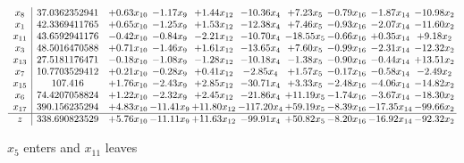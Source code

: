 \documentclass[9pt]{article}
\begin{document}
 \[\begin{array}{c| c c@{\hskip 2pt} c@{\hskip 2pt} c@{\hskip 2pt} c@{\hskip 2pt} c@{\hskip 2pt} c@{\hskip 2pt} c@{\hskip 2pt} c@{\hskip 2pt} }
 x_{8}   &  37.0362352941 & +  0.63 x_{10} & -1.17 x_{9} & +  1.44 x_{12} & -10.36 x_{4} & +  7.23 x_{5} & -0.79 x_{16} & -1.87 x_{14} & -10.98 x_{2}\\
 x_{1}   &  42.3369411765 & +  0.65 x_{10} & -1.25 x_{9} & +  1.53 x_{12} & -12.38 x_{4} & +  7.46 x_{5} & -0.93 x_{16} & -2.07 x_{14} & -11.60 x_{2}\\
 x_{11}   &  43.6592941176 & -0.42 x_{10} & -0.84 x_{9} & -2.21 x_{12} & -10.70 x_{4} & -18.55 x_{5} & -0.66 x_{16} & +  0.35 x_{14} & +  9.18 x_{2}\\
 x_{3}   &  48.5016470588 & +  0.71 x_{10} & -1.46 x_{9} & +  1.61 x_{12} & -13.65 x_{4} & +  7.60 x_{5} & -0.99 x_{16} & -2.31 x_{14} & -12.32 x_{2}\\
 x_{13}   &  27.5181176471 & -0.18 x_{10} & -1.08 x_{9} & -1.28 x_{12} & -10.18 x_{4} & -1.38 x_{5} & -0.90 x_{16} & -0.44 x_{14} & + 13.51 x_{2}\\
 x_{7}   &  10.7703529412 & +  0.21 x_{10} & -0.28 x_{9} & +  0.41 x_{12} & -2.85 x_{4} & +  1.57 x_{5} & -0.17 x_{16} & -0.58 x_{14} & -2.49 x_{2}\\
 x_{15}   &  107.416 & +  1.76 x_{10} & -2.43 x_{9} & +  2.85 x_{12} & -30.71 x_{4} & +  3.33 x_{5} & -2.48 x_{16} & -4.06 x_{14} & -14.82 x_{2}\\
 x_{6}   &  74.4207058824 & +  1.22 x_{10} & -2.32 x_{9} & +  2.45 x_{12} & -21.86 x_{4} & + 11.19 x_{5} & -1.74 x_{16} & -3.67 x_{14} & -18.30 x_{2}\\
 x_{17}   &  390.156235294 & +  4.83 x_{10} & -11.41 x_{9} & + 11.80 x_{12} & -117.20 x_{4} & + 59.19 x_{5} & -8.39 x_{16} & -17.35 x_{14} & -99.66 x_{2}\\
\hline
z    &  338.690823529 & +  5.76 x_{10} & -11.11 x_{9} & + 11.63 x_{12} & -99.91 x_{4} & + 50.82 x_{5} & -8.20 x_{16} & -16.92 x_{14} & -92.32 x_{2}\\
\end{array}\]


 $ x_{5} $ enters and $ x_{11} $ leaves 
\end{document}
